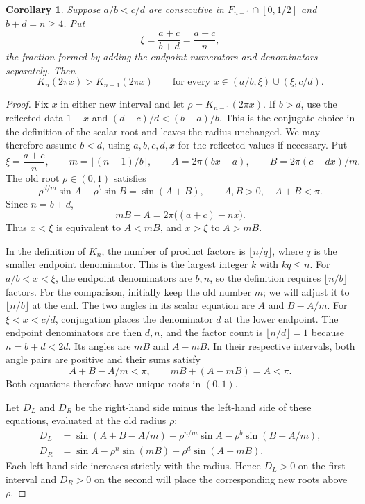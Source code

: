 \documentclass[11pt,a4paper]{article}
\newtheorem{corollary}[theorem]{Corollary}
\theoremstyle{definition}
\theoremstyle{remark}
\numberwithin{equation}{section}
\begin{document}
\begin{corollary}\label{lem:positive-mediant}
Suppose $a/b<c/d$ are consecutive in $F_{n-1}\cap[0,1/2]$ and $b+d=n\ge4$. Put
\[
 \xi=\frac{a+c}{b+d}=\frac{a+c}{n},
\]
the fraction formed by adding the endpoint numerators and denominators separately. Then
\[
 K_n(2\pi x)>K_{n-1}(2\pi x)
 \qquad\text{for every }x\in(a/b,\xi)\cup(\xi,c/d).
\]
\end{corollary}
\begin{proof}
Fix $x$ in either new interval and let $\rho=K_{n-1}(2\pi x)$. If $b>d$, use the reflected data $1-x$ and $(d-c)/d<(b-a)/b$. This is the conjugate choice in the definition of the scalar root and leaves the radius unchanged. We may therefore assume $b<d$, using $a,b,c,d,x$ for the reflected values if necessary. Put
\[
 \xi=\frac{a+c}{n},\qquad
 m=\lfloor(n-1)/b\rfloor,\qquad
 A=2\pi(bx-a),\qquad B=2\pi(c-dx)/m.
\]
The old root $\rho\in(0,1)$ satisfies
\begin{equation}\label{eq:old-mediant-scalar}
 \rho^{d/m}\sin A+\rho^b\sin B=\sin(A+B),
 \qquad A,B>0,\quad A+B<\pi.
\end{equation}
Since $n=b+d$,
\[
 mB-A=2\pi\bigl((a+c)-nx\bigr).
\]
Thus $x<\xi$ is equivalent to $A<mB$, and $x>\xi$ to $A>mB$.

In the definition of $K_n$, the number of product factors is $\lfloor n/q\rfloor$, where $q$ is the smaller endpoint denominator. This is the largest integer $k$ with $kq\le n$.
For $a/b<x<\xi$, the endpoint denominators are $b,n$, so the definition requires $\lfloor n/b\rfloor$ factors. For the comparison, initially keep the old number $m$; we will adjust it to $\lfloor n/b\rfloor$ at the end. The two angles in its scalar equation are $A$ and $B-A/m$.
For $\xi<x<c/d$, conjugation places the denominator $d$ at the lower endpoint. The endpoint denominators are then $d,n$, and the factor count is $\lfloor n/d\rfloor=1$ because $n=b+d<2d$. Its angles are $mB$ and $A-mB$.
In their respective intervals, both angle pairs are positive and their sums satisfy
\[
 A+B-A/m<\pi,\qquad mB+(A-mB)=A<\pi.
\]
Both equations therefore have unique roots in $(0,1)$.

Let $D_L$ and $D_R$ be the right-hand side minus the left-hand side of these equations, evaluated at the old radius $\rho$:
\begin{align*}
 D_L&=\sin(A+B-A/m)-\rho^{n/m}\sin A
                            -\rho^b\sin(B-A/m),\\
 D_R&=\sin A-\rho^n\sin(mB)-\rho^d\sin(A-mB).
\end{align*}
Each left-hand side increases strictly with the radius. Hence $D_L>0$ on the first interval and $D_R>0$ on the second will place the corresponding new roots above $\rho$.


\end{proof}
\end{document}

